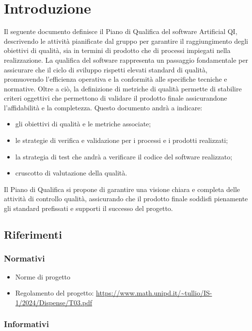 \section{Introduzione}
\label{sec:introduzione_pq}
Il seguente documento definisce il Piano di Qualifica del software Artificial QI, descrivendo le attività  pianificate dal gruppo
per garantire il raggiungimento degli obiettivi di qualità, sia in termini di prodotto che di processi impiegati nella realizzazione.
La qualifica del software rappresenta un passaggio fondamentale per assicurare che il ciclo di sviluppo rispetti elevati standard di qualità, 
promuovendo l'efficienza operativa e la conformità alle specifiche tecniche e normative.
Oltre a ciò, la definizione di metriche di qualità permette di stabilire criteri oggettivi che permettono di validare il prodotto finale 
assicurandone l'affidabilità e la completezza.
Questo documento andrà a indicare:
\begin{itemize}
    \item gli obiettivi di qualità e le metriche associate;
    \item le strategie di verifica e validazione per i processi e i prodotti realizzati;
    \item la strategia di test che andrà a verificare il codice del software realizzato;
    \item cruscotto di valutazione della qualità.
\end{itemize}
Il Piano di Qualifica si propone di garantire una visione chiara e completa delle attività di controllo qualità, 
assicurando che il prodotto finale soddisfi pienamente gli standard prefissati e supporti il successo del progetto.
\subsection{Riferimenti}
\subsubsection{Normativi}
\begin{itemize}
    \item Norme di progetto
    \item Regolamento del progetto: \url{https://www.math.unipd.it/~tullio/IS-1/2024/Dispense/T03.pdf}
\end{itemize}
\subsubsection{Informativi}


